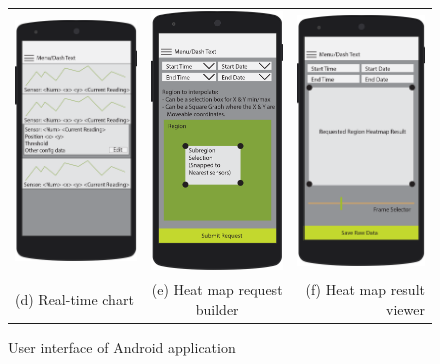 \documentclass{article}
\begin{document}
\begin{figure}[!htbp]
\begin{center}
\begin{tabular}{l c r}
\includegraphics[width=0.25\linewidth]{Images/bare-nexus-5-mockup-screen-individual_data.png}&
\includegraphics[width=0.25\linewidth]{Images/bare-nexus-5-mockup-screen-heat-map-request.png}&
\includegraphics[width=0.25\linewidth]{Images/bare-nexus-5-mockup-screen-heat-map-result.png}\\
(d) Real-time chart & (e) Heat map request builder & (f) Heat map result viewer

\end{tabular}
\end{center}
\vspace{-0.15in}
\caption{\label{fig:app-ui}User interface of Android application}
\end{figure}
 
\end{document}

